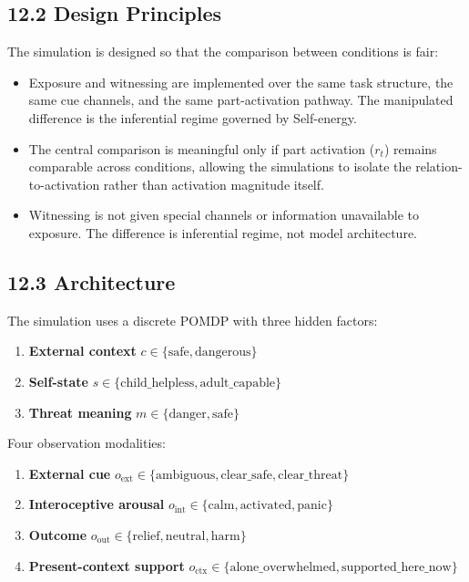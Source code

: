 \documentclass[11pt]{article}
\providecommand{\tightlist}{%
  \setlength{\itemsep}{0pt}\setlength{\parskip}{0pt}}
\begin{document}
\subsection{12.2 Design Principles}\label{design-principles}

The simulation is designed so that the comparison between conditions is
fair:

\begin{itemize}
\tightlist
\item
  Exposure and witnessing are implemented over the same task structure,
  the same cue channels, and the same part-activation pathway. The
  manipulated difference is the inferential regime governed by
  Self-energy.
\item
  The central comparison is meaningful only if part activation (\(r_t\))
  remains comparable across conditions, allowing the simulations to
  isolate the relation-to-activation rather than activation magnitude
  itself.
\item
  Witnessing is not given special channels or information unavailable to
  exposure. The difference is inferential regime, not model
  architecture.
\end{itemize}

\subsection{12.3 Architecture}\label{architecture}

The simulation uses a discrete POMDP with three hidden factors:

\begin{enumerate}
\def\labelenumi{\arabic{enumi}.}
\tightlist
\item
  \textbf{External context} \(c \in \{\text{safe}, \text{dangerous}\}\)
\item
  \textbf{Self-state}
  \(s \in \{\text{child\_helpless}, \text{adult\_capable}\}\)
\item
  \textbf{Threat meaning} \(m \in \{\text{danger}, \text{safe}\}\)
\end{enumerate}

Four observation modalities:

\begin{enumerate}
\def\labelenumi{\arabic{enumi}.}
\tightlist
\item
  \textbf{External cue}
  \(o_{\text{ext}} \in \{\text{ambiguous}, \text{clear\_safe}, \text{clear\_threat}\}\)
\item
  \textbf{Interoceptive arousal}
  \(o_{\text{int}} \in \{\text{calm}, \text{activated}, \text{panic}\}\)
\item
  \textbf{Outcome}
  \(o_{\text{out}} \in \{\text{relief}, \text{neutral}, \text{harm}\}\)
\item
  \textbf{Present-context support}
  \(o_{\text{ctx}} \in \{\text{alone\_overwhelmed}, \text{supported\_here\_now}\}\)
\end{enumerate}
\end{document}
